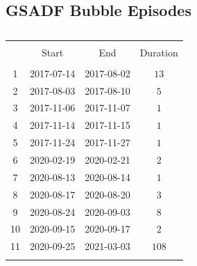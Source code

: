 \documentclass[11pt]{article}
\begin{document}
\begin{appendices}
\section{GSADF Bubble Episodes}
\begin{table}[!htbp] \centering 
  \caption{} 
  \label{} 
\begin{tabular}{@{\extracolsep{5pt}} cccc} 
\\[-1.8ex]\hline 
\hline \\[-1.8ex] 
 & Start & End & Duration \\ 
\hline \\[-1.8ex] 
1 & 2017-07-14 & 2017-08-02 & $13$ \\ 
2 & 2017-08-03 & 2017-08-10 & $5$ \\ 
3 & 2017-11-06 & 2017-11-07 & $1$ \\ 
4 & 2017-11-14 & 2017-11-15 & $1$ \\ 
5 & 2017-11-24 & 2017-11-27 & $1$ \\ 
6 & 2020-02-19 & 2020-02-21 & $2$ \\ 
7 & 2020-08-13 & 2020-08-14 & $1$ \\ 
8 & 2020-08-17 & 2020-08-20 & $3$ \\ 
9 & 2020-08-24 & 2020-09-03 & $8$ \\ 
10 & 2020-09-15 & 2020-09-17 & $2$ \\ 
11 & 2020-09-25 & 2021-03-03 & $108$ \\ 
\hline \\[-1.8ex] 
\end{tabular} 
\end{table} 

\end{appendices}
\end{document}
